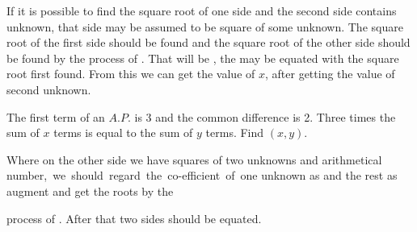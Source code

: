 \documentclass[]{article}
\begin{document}
\begin{quote}  {
}  \end{quote}

{If it is possible to find the square root of one side and the second
side contains unknown, that side may be assumed to be square of some
unknown. The square root of the first side should be found and the
square root of the other side should be found by the process of
{}. That will be {}, the {} may be equated
with the square root first found. From this we can get the value of $x$,
after getting the value of second unknown.}

\begin{quote}  {
}  \end{quote}

{The first term of an $A. P.$ is 3 and the common difference is 2. Three
times the sum of $x$ terms is equal to the sum of $y$ terms. Find $(x, y)$.}

\begin{quote}  {
}  \end{quote}

Where on the other side we have squares of two unknowns and arithmetical \,number, \,we \,should \,regard \,the \,co-efficient \,of \,one unknown as {} and the rest as augment and get the roots by the
\newpage
\large

\noindent process of {}. After that two sides should be equated.

\begin{quote}  {
}  \end{quote}
\end{document}
